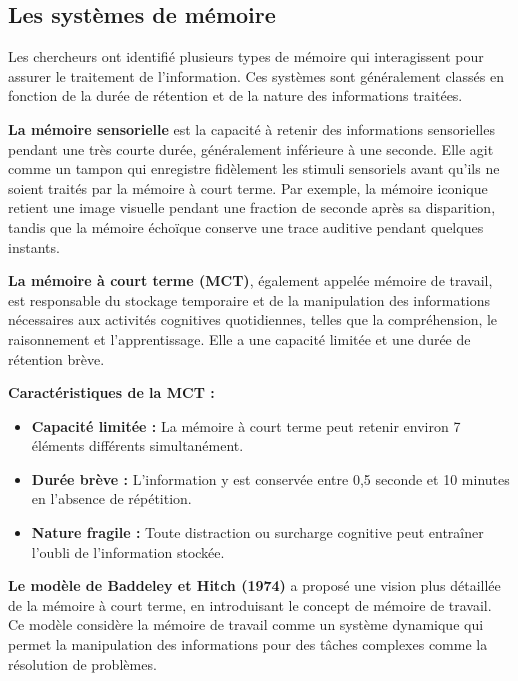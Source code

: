 \documentclass[12pt,a4paper]{report}
\begin{document}
\subsection{Les systèmes de mémoire}

Les chercheurs ont identifié plusieurs types de mémoire qui interagissent pour assurer le traitement de l'information. Ces systèmes sont généralement classés en fonction de la durée de rétention et de la nature des informations traitées.
\cite{frcneurodon}

\textbf{La mémoire sensorielle} est la capacité à retenir des informations sensorielles pendant une très courte durée, généralement inférieure à une seconde. Elle agit comme un tampon qui enregistre fidèlement les stimuli sensoriels avant qu'ils ne soient traités par la mémoire à court terme. Par exemple, la mémoire iconique retient une image visuelle pendant une fraction de seconde après sa disparition, tandis que la mémoire échoïque conserve une trace auditive pendant quelques instants.

\textbf{La mémoire à court terme (MCT)}, également appelée mémoire de travail, est responsable du stockage temporaire et de la manipulation des informations nécessaires aux activités cognitives quotidiennes, telles que la compréhension, le raisonnement et l'apprentissage. Elle a une capacité limitée et une durée de rétention brève.

\newpage
\textbf{Caractéristiques de la MCT :}
\begin{itemize}
    \item \textbf{Capacité limitée :} La mémoire à court terme peut retenir environ 7 éléments différents simultanément.
    \item \textbf{Durée brève :} L'information y est conservée entre 0,5 seconde et 10 minutes en l'absence de répétition.
    \item \textbf{Nature fragile :} Toute distraction ou surcharge cognitive peut entraîner l'oubli de l'information stockée.
\end{itemize}

\textbf{Le modèle de Baddeley et Hitch (1974)} a proposé une vision plus détaillée de la mémoire à court terme, en introduisant le concept de mémoire de travail. Ce modèle considère la mémoire de travail comme un système dynamique qui permet la manipulation des informations pour des tâches complexes comme la résolution de problèmes.
\end{document}
